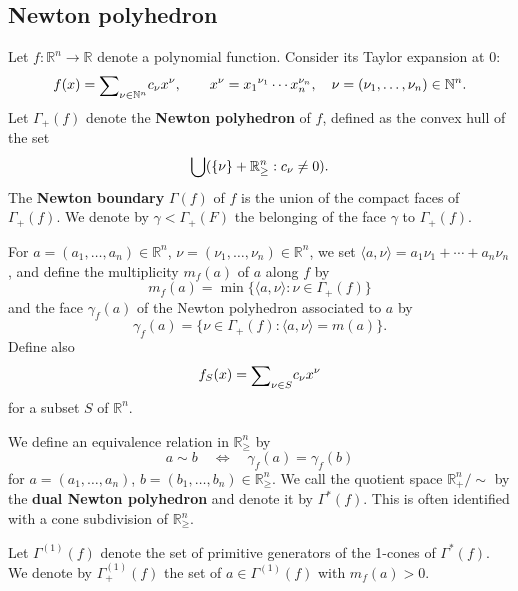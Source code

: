 \documentclass[12pt,a4paper,leqno]{amsart}
\theoremstyle{definition}
\begin{document}
\subsection{Newton polyhedron}\label{Np}
Let $f:{\mathbb{R}}^n\to{\mathbb{R}}$ denote a polynomial function.
Consider its Taylor expansion at $0$:
$$
f(x)={\mathop{\textrm{\scriptsize $\mathop\sum$}}}_{\nu \in {\mathbb{N}}^n}c_\nu x^\nu,\qquad
x^\nu={x_1}^{\nu_1}\cdots x_n^{\nu_n},\quad\nu=(\nu_1,\dots,\nu_n) \in {\mathbb{N}}^n. 
$$
Let $\Gamma_+(f)$ denote the \textbf{Newton polyhedron} of $f$,
defined as the convex hull of the set
$$
{\mathop{\textrm{\small $\mathop\bigcup$}}}(\{\nu\}+{\mathbb{R}}_\ge^n:c_\nu\ne0). 
$$
The \textbf{Newton boundary} $\Gamma(f)$ of $f$ is the union of the
compact faces of $\Gamma_+(f)$. We denote by $\gamma < \Gamma_+(F)$
the belonging of the face $\gamma$ to $\Gamma_+(f)$.

For $a=(a_1,\dots,a_n)\in \mathbb R^n$, $\nu=(\nu_1,\dots,\nu_n)\in \mathbb R^n$, we set 
$\langle a,\nu\rangle=a_1\nu_1+\cdots+a_n\nu_n$, and define the
multiplicity $m_f(a)$ of $a$ along $f$ by
$$
m_f(a)=\min\{\langle a,\nu\rangle :\nu\in\Gamma_+(f)\}$$
and the face $\gamma_f(a)$ of the Newton polyhedron associated to $a$
by
$$
\gamma_f(a)=\{\nu\in\Gamma_+(f):\langle a,\nu\rangle=m(a)\}.$$
Define also 
$$f_S(x)={\mathop{\textrm{\scriptsize $\mathop\sum$}}}_{\nu\in S}c_\nu x^\nu$$
for a subset $S$ of ${\mathbb{R}}^n$. 

We define an equivalence relation in ${\mathbb{R}}_\ge^n$ by 
$$
a\sim b \quad\Longleftrightarrow\quad \gamma_f(a)=\gamma_f(b)
$$
for $a=(a_1,\dots,a_n)$, $b=(b_1,\dots,b_n)\in{\mathbb{R}}^n_\ge$. 
We call the quotient space ${\mathbb{R}}^n_+/\sim$ by the 
\textbf{dual Newton polyhedron} 
and denote it by $\Gamma^*(f)$. This is often identified with a cone
subdivision of ${\mathbb{R}}_\ge^n$.  

Let $\Gamma^{(1)}(f)$ denote the set of primitive generators of the
1-cones of $\Gamma^*(f)$. We denote by $\Gamma^{(1)}_+(f)$ the set of $a\in\Gamma^{(1)}(f)$ 
with $m_f(a)>0$. 
\end{document}
